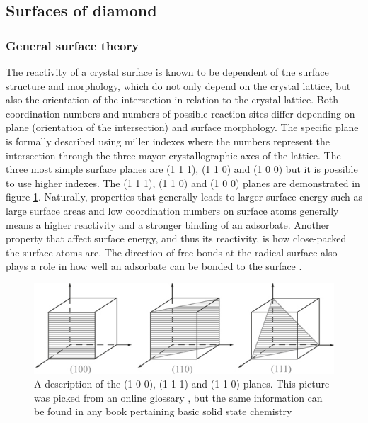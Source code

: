 \documentclass[12pt,a4paper]{article}
\begin{document}
\subsection{Surfaces of diamond}
\subsubsection{General surface theory}
The reactivity of a crystal surface is known to be dependent of the surface structure and morphology, which do not only depend on the crystal lattice, but also the orientation of the intersection in relation to the crystal lattice. Both coordination numbers and numbers of possible reaction sites differ depending on plane (orientation of the intersection) and surface morphology. The specific plane is formally described using miller indexes where the numbers represent the intersection through the three mayor crystallographic axes of the lattice. The three most simple surface planes are (1 1 1), (1 1 0) and (1 0 0) but it is possible to use higher indexes. The (1 1 1), (1 1 0) and (1 0 0) planes are demonstrated in figure \ref{millerindex}. Naturally, properties that generally leads to larger surface energy such as large surface areas and low coordination numbers on surface atoms generally means a higher reactivity and a stronger binding of an adsorbate. Another property that affect surface energy, and thus its reactivity, is how close-packed the surface atoms are. The direction of free bonds at the radical surface also plays a role in how well an adsorbate can be bonded to the surface \cites{surfaces, BAHC}. 

\begin{figure} \captionsetup{width=.8\linewidth}
\caption{A description of the  (1 0 0), (1 1 1) and (1 1 0) planes. This picture was picked from an online glossary \cite{millerindex}, but the same information can be found in any book pertaining basic solid state chemistry} \label{millerindex}
%
\includegraphics[width=.8\linewidth]{pictures/millerindex.png}
\end{figure}
\end{document}
